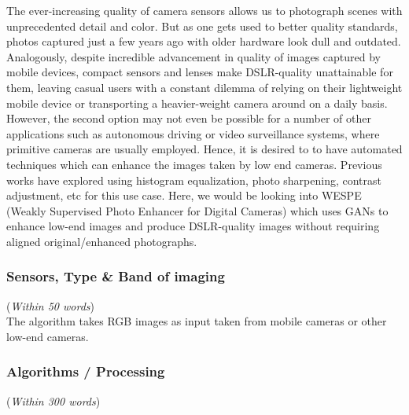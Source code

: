 \documentclass[11pt]{article}
\begin{document}
The ever-increasing quality of camera sensors allows us to
photograph scenes with unprecedented detail and color. But
as one gets used to better quality standards, photos captured
just a few years ago with older hardware look dull and outdated.
Analogously, despite incredible advancement in quality
of images captured by mobile devices, compact sensors
and lenses make DSLR-quality unattainable for them, leaving
casual users with a constant dilemma of relying on their
lightweight mobile device or transporting a heavier-weight
camera around on a daily basis. However, the second option
may not even be possible for a number of other applications
such as autonomous driving or video surveillance systems,
where primitive cameras are usually employed. Hence, it is desired to
to have automated techniques which can enhance the images taken by low
end cameras. Previous works have explored using histogram equalization, photo
sharpening, contrast adjustment, etc for this use case. Here, we would be looking into WESPE (Weakly Supervised Photo Enhancer for Digital Cameras) which uses GANs to enhance low-end images and produce DSLR-quality images without requiring aligned original/enhanced photographs.

\subsubsection{Sensors, Type \& Band of imaging}
({\em Within 50 words}) \\

The algorithm takes RGB images as input taken from mobile cameras or other low-end cameras.

\subsubsection{Algorithms / Processing} 
({\em Within 300 words})\\

\end{document}

